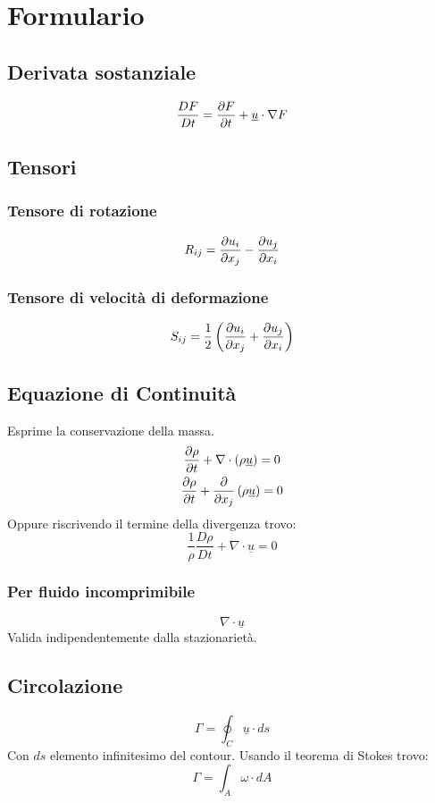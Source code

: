 \newpage
\section{Formulario}
\subsection{Derivata sostanziale}

\[
  \frac{D F}{Dt}=\frac{\partial F}{\partial t}+\underline{u}\cdot \nabla F
\]
\subsection{Tensori}
\subsubsection{Tensore di rotazione}
\[
  R_{ij} = \frac{\partial u_i}{\partial x_j}-\frac{\partial u_j}{\partial x_i}
\]
\subsubsection{Tensore di velocità di deformazione}
\[
  S_{ij}=\frac{1}{2}\left( \frac{\partial u_i}{\partial x_j}+\frac{\partial u_j}{\partial x_i}\right) 
\]


\subsection{Equazione di Continuità}
Esprime la conservazione della massa.
\begin{gather*}
  \frac{\partial\rho }{\partial t}+\nabla\cdot \left( \rho \underline{u}\right) =0\\
  \frac{\partial\rho }{\partial t}+\frac{\partial}{\partial x_j}\left( \rho \underline{u}\right) =0
\end{gather*}
Oppure riscrivendo il termine della divergenza trovo:
\[
  \frac{1}{\rho }\frac{D \rho }{Dt}+ \nabla\cdot \underline{u}=0
\]
\subsubsection{Per fluido incomprimibile}
\[
  \nabla\cdot \underline{u}
\]
Valida indipendentemente dalla stazionarietà.
\subsection{Circolazione}
\[
  \Gamma =\displaystyle{\oint_{C}^{}}\underline{u}\cdot ds
\]
Con $ ds $ elemento infinitesimo del contour. Usando il teorema di Stokes trovo:
\[
  \Gamma =\displaystyle{\int_{A}^{}}\omega\cdot dA
\]

